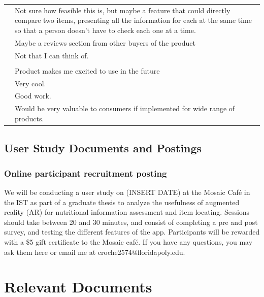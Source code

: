 \documentclass[thesis]{fputhesis}
\begin{document}
\begin{body}
\begin{appendices}
\begin{longtable}[h]{@{} >{\raggedright\arraybackslash}p{} >{\raggedright\arraybackslash}p{} @{}}
            & Not sure how feasible this is, but maybe a feature that could directly compare two items, presenting all the information for each at the same time so that a person doesn't have to check each one at a time. \\  
            & Maybe a reviews section from other buyers of the product \\  
            & Not that I can think of. \\ 
        \\
        \multirow[t]{4}{.38\textwidth}{Any other comments?}
            & Product makes me excited to use in the future \\  
            & Very cool. \\  
            & Good work. \\  
            & Would be very valuable to consumers if implemented for wide range of products. \\ 
\end{longtable}

\section{User Study Documents and Postings}
\subsection{Online participant recruitment posting}
We will be conducting a user study on (INSERT DATE) at the Mosaic Café in the IST as part of a graduate thesis to analyze the usefulness of augmented reality (AR) for nutritional information assessment and item locating. Sessions should take between 20 and 30 minutes, and consist of completing a pre and post survey, and testing the different features of the app. Participants will be rewarded with a \$5 gift certificate to the Mosaic café. If you have any questions, you may ask them here or email me at croche2574@floridapoly.edu.

\chapter{Relevant Documents}

\end{appendices}
\end{body}
\end{document}
